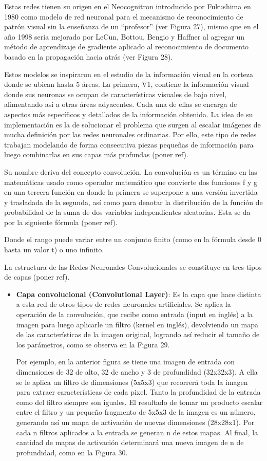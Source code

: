\begin{itemize}
\begin{itemize}
		Estas redes tienen su origen en el Neocognitron introducido por Fukushima en 1980 como modelo de red neuronal para el mecanismo de reconocimiento de patrón visual sin la enseñanza de un “profesor” (ver Figura 27), mismo que en el año 1998 sería mejorado por LeCun, Bottou, Bengio y Haffner al agregar un método de aprendizaje de gradiente aplicado al reconocimiento de documento basado en la propagación hacia atrás (ver Figura 28).
		
		Estos modelos se inspiraron en el estudio de la información visual en la corteza donde se ubican hasta 5 áreas. La primera, V1, contiene la información visual donde sus neuronas se ocupan de características visuales de bajo nivel, alimentando así a otras áreas adyacentes. Cada una de ellas se encarga de aspectos más específicos y detallados de la información obtenida. La idea de su implementación es la de solucionar el problema que surgen al escalar imágenes de mucha definición por las redes neuronales ordinarias. Por ello, este tipo de redes trabajan modelando de forma consecutiva piezas pequeñas de información para luego combinarlas en sus capas más profundas (poner ref).
		
		Su nombre deriva del concepto convolución. La convolución es un término en las matemáticas usado como operador matemático que convierte dos funciones f y g en una tercera función en donde la primera se superpone a una versión invertida y trasladada de la segunda, así como para denotar la distribución de la función de probabilidad de la suma de dos variables independientes aleatorias. Esta se da por la siguiente fórmula (poner ref).
		
		Donde el rango puede variar entre un conjunto finito (como en la fórmula desde 0 hasta un valor t) o uno infinito.
		
		La estructura de las Redes Neuronales Convolucionales se constituye en tres tipos de capas (poner ref).
		\begin{itemize}
			\item \textbf{Capa convolucional (Convolutional Layer)}: Es la capa que hace distinta a esta red de otros tipos de redes neuronales artificiales. Se aplica la operación de la convolución, que recibe como entrada (input en inglés) a la imagen para luego aplicarle un filtro (kernel en inglés), devolviendo un mapa de las características de la imagen original, logrando así reducir el tamaño de los parámetros, como se observa en la Figura 29.
			
			Por ejemplo, en la anterior figura se tiene una imagen de entrada con dimensiones de 32 de alto, 32 de ancho y 3 de profundidad (32x32x3). A ella se le aplica un filtro de dimensiones (5x5x3) que recorrerá toda la imagen para extraer características de cada pixel. Tanto la profundidad de la entrada como del filtro siempre son iguales. El resultado de tomar un producto escalar entre el filtro y un pequeño fragmento de 5x5x3 de la imagen es un número, generando así un mapa de activación de nuevas dimensiones (28x28x1). Por cada n filtros aplicados a la entrada se generan n de estos mapas. Al final, la cantidad de mapas de activación determinará una nueva imagen de n de profundidad, como en la Figura 30.
			

\end{itemize}
\end{itemize}
\end{itemize}
